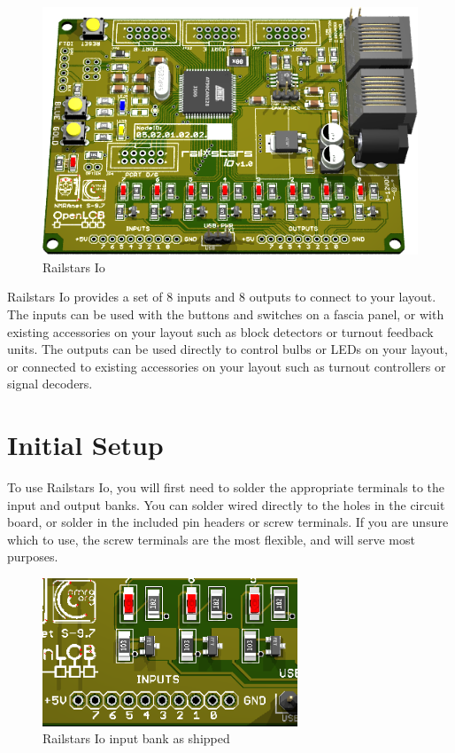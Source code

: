 \documentclass[12pt]{book}
\begin{document}
\begin{figure}[htbp]
\begin{center}
\includegraphics[width=6in]{images/RailstarsIo.png}
\caption{Railstars Io}
\label{Io}
\end{center}
\end{figure}


Railstars Io provides a set of 8 inputs and 8 outputs to connect to your layout. The inputs can be used with the buttons and switches on a fascia panel, or with existing accessories on your layout such as block detectors or turnout feedback units. The outputs can be used directly to control bulbs or LEDs on your layout, or connected to existing accessories on your layout such as turnout controllers or signal decoders.

\section{Initial Setup}

To use Railstars Io, you will first need to solder the appropriate terminals to the input and output banks. You can solder wired directly to the holes in the circuit board, or solder in the included pin headers or screw terminals. If you are unsure which to use, the screw terminals are the most flexible, and will serve most purposes.

\begin{figure}[htbp]
\begin{center}
\includegraphics[width=3in]{images/IoInputEmpty.png}
\caption{Railstars Io input bank as shipped}
\label{bareinput}
\end{center}
\end{figure}
\end{document}
